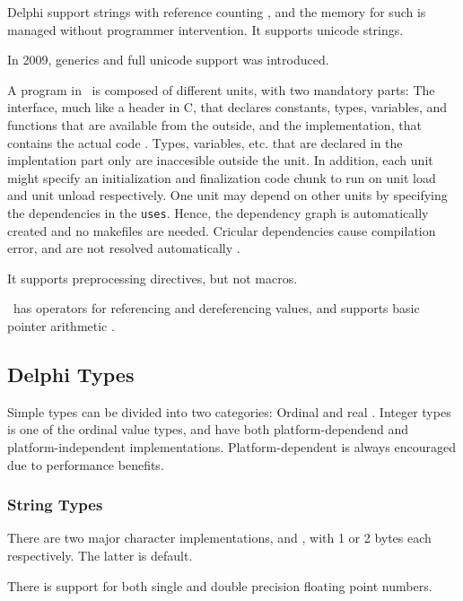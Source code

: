 Delphi support strings with reference counting \cite{Wikipedia_contributors2016-jk}, and the memory for such is managed without programmer intervention. It supports unicode strings.

In 2009, generics and full unicode support was introduced.

A program in \delphi~is composed of different units, with two mandatory parts: The interface, much like a header in C, that declares constants, types, variables, and functions that are available from the outside, and the implementation, that contains the actual code \cite{noauthor_undated-pl}. Types, variables, etc. that are declared in the implentation part only are inaccesible outside the unit. In addition, each unit might specify an initialization and finalization code chunk to run on unit load and unit unload respectively. One unit may depend on other units by specifying the dependencies in the \texttt{uses}. Hence, the dependency graph is automatically created and no makefiles are needed. Cricular dependencies cause compilation error, and are not resolved automatically \cite{noauthor_undated-sp}.

It supports preprocessing directives, but not macros.

\delphi~has operators for referencing and dereferencing values, and supports basic pointer arithmetic \cite{noauthor_undated-cn}.

\subsection{Delphi Types}
\label{sub:Delphi Types}

Simple types can be divided into two categories: Ordinal and real \cite{noauthor_undated-st}. Integer types is one of the ordinal value types, and have both platform-dependend and platform-independent implementations. Platform-dependent is always encouraged due to performance benefits.

\subsubsection{String Types}
\label{ssub:String Types}
There are two major character implementations,  and , with 1 or 2 bytes each respectively. The latter is default.

There is support for both single and double precision floating point numbers.

